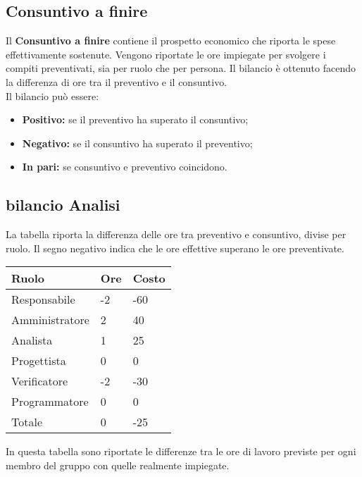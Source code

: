 \begin{flushleft}
\chapter{Consuntivo a finire}
Il \textbf{Consuntivo a finire} contiene il prospetto economico che riporta le spese effettivamente sostenute. Vengono riportate le ore impiegate per svolgere i compiti preventivati, sia per
ruolo che per persona. Il bilancio è ottenuto facendo la differenza di ore tra il preventivo e il consuntivo.\\
Il bilancio può essere:
\begin{itemize}
    \item \textbf{Positivo:} se il preventivo ha superato il consuntivo;
    \item \textbf{Negativo:} se il consuntivo ha superato il preventivo;
    \item \textbf{In pari:} se consuntivo e preventivo coincidono.
\end{itemize}
\section{bilancio Analisi}
La tabella riporta la differenza delle ore tra preventivo e consuntivo, divise per ruolo. Il segno negativo indica che le ore effettive superano le ore preventivate.    
\begin{table}[h]
    \begin{tabular}{|l|l|l|}
    \hline
    Ruolo          & Ore & Costo \\ \hline
    Responsabile   & -2  & -60   \\ \hline
    Amministratore & 2   & 40    \\ \hline
    Analista       & 1   & 25    \\ \hline
    Progettista    & 0   & 0     \\ \hline
    Verificatore   & -2  & -30   \\ \hline
    Programmatore  & 0   & 0     \\ \hline
    Totale         & 0   & -25   \\ \hline
    \end{tabular}
\end{table}
In questa tabella  sono riportate le differenze tra le ore di lavoro previste per ogni membro del gruppo con quelle realmente impiegate.


\end{flushleft}
